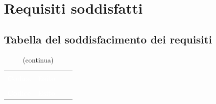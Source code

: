 \section{Requisiti soddisfatti}

\subsection{Tabella del soddisfacimento dei requisiti}

\begin{longtable}{C{3cm} C{3cm} L{5.5cm} C{3cm}}
\caption{Tabella del soddisfacimento dei requisiti}\\
\textcolor{white}{\textbf{Codice}} & \textcolor{white}{\textbf{Esito}}\\
		\endfirsthead
		\caption[]{(continua)} \\
\textcolor{white}{\textbf{Codice}} & \textcolor{white}{\textbf{Esito}}\\
		\endhead
		

\end{longtable}
